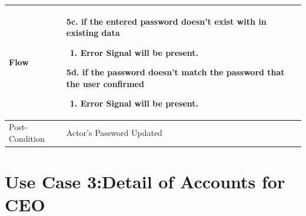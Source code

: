 \documentclass[12pt,a4paper]{report}
\begin{document}
\begin{tabular}{ | m{3cm} | m{12cm}| } \hline
Flow & 5c. if the entered password doesn't exist with in existing data
	\begin{enumerate}
		\item Error Signal will be present.
	\end{enumerate}
	
5d. if the password doesn't match the password that the user confirmed
	\begin{enumerate}
		\item Error Signal will be present.
	\end{enumerate}
	
\\ \hline
Post-Condition & Actor's Password Updated   \\\hline
\end{tabular}
\section{Use Case 3:Detail of Accounts for CEO }
\end{document}
